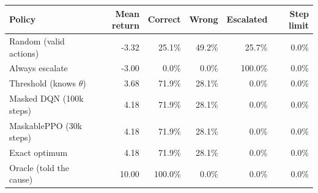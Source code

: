 \begin{tabular}{@{}lrrrrr@{}}
\toprule
Policy & Mean return & Correct & Wrong & Escalated & Step limit \\
\midrule
Random (valid actions) & -3.32 & 25.1\% & 49.2\% & 25.7\% & 0.0\% \\
Always escalate & -3.00 & 0.0\% & 0.0\% & 100.0\% & 0.0\% \\
Threshold (knows $\theta$) & 3.68 & 71.9\% & 28.1\% & 0.0\% & 0.0\% \\
Masked DQN (100k steps) & 4.18 & 71.9\% & 28.1\% & 0.0\% & 0.0\% \\
MaskablePPO (30k steps) & 4.18 & 71.9\% & 28.1\% & 0.0\% & 0.0\% \\
Exact optimum & 4.18 & 71.9\% & 28.1\% & 0.0\% & 0.0\% \\
Oracle (told the cause) & 10.00 & 100.0\% & 0.0\% & 0.0\% & 0.0\% \\
\bottomrule
\end{tabular}
